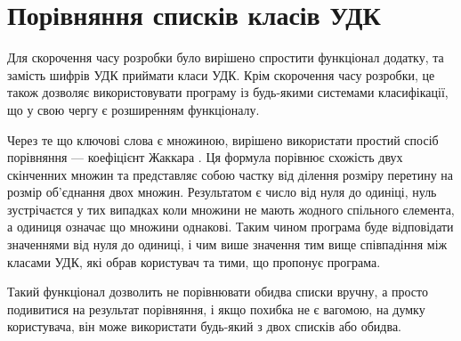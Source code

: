 \documentclass{article}
\let\oldsection\section
\renewcommand{\section}{\clearpage\oldsection}
\begin{document}
\section{Порівняння списків класів УДК}
Для скорочення часу розробки було вирішено спростити функціонал додатку,
  та замість шифрів УДК приймати класи УДК.
  Крім скорочення часу розробки, це також дозволяє використовувати програму
  із будь-якими системами класифікації,
  що у свою чергу є розширенням функціоналу.

  Через те що ключові слова є множиною, вирішено використати простий спосіб
  порівняння --- коефіцієнт Жаккара .
  Ця формула порівнює схожість двух скінченних множин та представляє собою
  частку від ділення розміру перетину 
  на розмір об'єднання  двох множин.
  Результатом є число від нуля до одиніці, нуль зустрічаєтся
  у тих випадках коли множини не мають жодного спільного єлемента,
  а одиниця означає що множини однакові.
  Таким чином програма буде відповідати значеннями від нуля до одиниці,
  і чим више значення тим вище співпадіння між класами УДК,
  які обрав користувач та тими, що пропонує програма.

  Такий функціонал дозволить не порівнювати обидва списки вручну,
  а просто подивитися на результат порівняння, і якщо похибка не є вагомою,
  на думку користувача, він може використати будь-який з двох списків або обидва.
\end{document}
